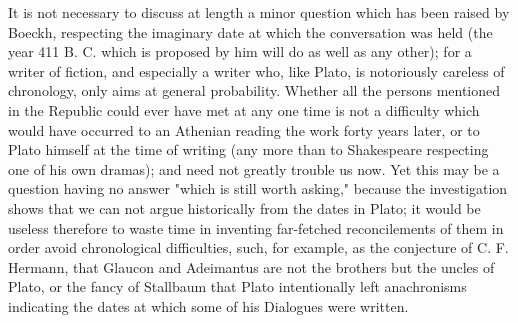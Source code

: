 It is not necessary to discuss at length a minor question which has been raised by Boeckh, respecting the imaginary date at which the conversation was held (the year 411 B. C. which is proposed by him will do as well as any other); for a writer of fiction, and especially a writer who, like Plato, is notoriously careless of chronology, only aims at general probability. Whether all the persons mentioned in the Republic could ever have met at any one time is not a difficulty which would have occurred to an Athenian reading the work forty years later, or to Plato himself at the time of writing (any more than to Shakespeare respecting one of his own dramas); and need not greatly trouble us now. Yet this may be a question having no answer "which is still worth asking," because the investigation shows that we can not argue historically from the dates in Plato; it would be useless therefore to waste time in inventing far-fetched reconcilements of them in order avoid chronological difficulties, such, for example, as the conjecture of C. F. Hermann, that Glaucon and Adeimantus are not the brothers but the uncles of Plato, or the fancy of Stallbaum that Plato intentionally left anachronisms indicating the dates at which some of his Dialogues were written.

